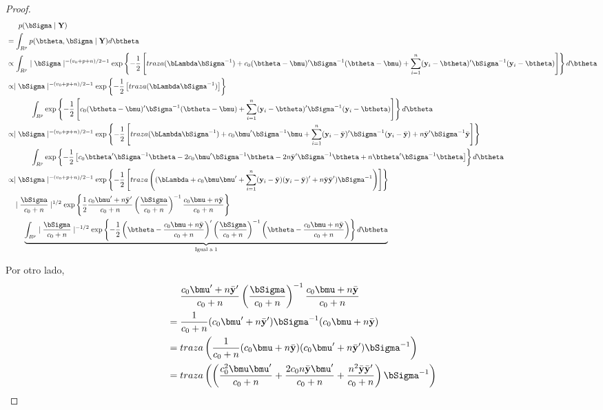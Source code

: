\documentclass[10pt,openright]{book}\usepackage[]{graphicx}\usepackage[]{color}
\begin{document}
\begin{proof}
\begin{align*}
&\ \ \ \ \ p(\bSigma\mid\mathbf{Y})\\
&=\int_{R^p} p(\btheta,\bSigma\mid\mathbf{Y})d\btheta\\
&\propto \int_{R^p}\mid\bSigma\mid^{-(v_0+p+n)/2-1}\exp\left\{-\frac{1}{2}\left[traza(\bLambda\bSigma^{-1})+c_0(\btheta-\bmu)'\bSigma^{-1}(\btheta-\bmu)+\sum_{i=1}^n(\mathbf{y}_i-\btheta)'\bSigma^{-1}(\mathbf{y}_i-\btheta)\right]\right\}d\btheta\\
&\propto \mid\bSigma\mid^{-(v_0+p+n)/2-1} \exp\left\{-\frac{1}{2}\left[traza(\bLambda\bSigma^{-1})\right]\right\}\\
&\ \ \ \ \ \ \ \ \ \ \int_{R^p}\exp\left\{-\frac{1}{2}\left[c_0(\btheta-\bmu)'\bSigma^{-1}(\btheta-\bmu)+\sum_{i=1}^n(\mathbf{y}_i-\btheta)'\bSigma^{-1}(\mathbf{y}_i-\btheta)\right]\right\}d\btheta\\
&\propto \mid\bSigma\mid^{-(v_0+p+n)/2-1} \exp\left\{-\frac{1}{2}\left[traza(\bLambda\bSigma^{-1})+c_0\bmu'\bSigma^{-1}\bmu+\sum_{i=1}^n(\mathbf{y}_i-\bar{\mathbf{y}})'\bSigma^{-1}(\mathbf{y}_i-\bar{\mathbf{y}})+n\bar{\mathbf{y}}'\bSigma^{-1}\bar{\mathbf{y}}\right]\right\}\\
&\ \ \ \ \ \ \ \ \ \ \int_{R^p}\exp\left\{-\frac{1}{2}\left[c_0\btheta'\bSigma^{-1}\btheta-2c_0\bmu'\bSigma^{-1}\btheta-2n\bar{\mathbf{y}}'\bSigma^{-1}\btheta+n\btheta'\bSigma^{-1}\btheta\right]\right\}d\btheta\\
&\propto \mid\bSigma\mid^{-(v_0+p+n)/2-1} \exp\left\{-\frac{1}{2}\left[traza\left((\bLambda+c_0\bmu\bmu'+\sum_{i=1}^n(\mathbf{y}_i-\bar{\mathbf{y}})(\mathbf{y}_i-\bar{\mathbf{y}})'+n\bar{\mathbf{y}}\bar{\mathbf{y}}')\bSigma^{-1}\right)\right]\right\}\\
&\ \ \ \mid\frac{\bSigma}{c_0+n}\mid^{1/2}\exp\left\{\frac{1}{2}\frac{c_0\bmu'+n\bar{\mathbf{y}}'}{c_0+n}\left(\frac{\bSigma}{c_0+n}\right)^{-1}\frac{c_0\bmu+n\bar{\mathbf{y}}}{c_0+n}\right\}\\
&\ \ \ \ \ \ \ \underbrace{\int_{R^p}\mid\frac{\bSigma}{c_0+n}\mid^{-1/2}\exp\left\{-\frac{1}{2}\left(\btheta-\frac{c_0\bmu+n\bar{\mathbf{y}}}{c_0+n}\right)'\left(\frac{\bSigma}{c_0+n}\right)^{-1}\left(\btheta-\frac{c_0\bmu+n\bar{\mathbf{y}}}{c_0+n}\right)\right\}d\btheta}_{\text{Igual a 1}}
\end{align*}

Por otro lado, 
\begin{align*}
&\ \ \ \ \frac{c_0\bmu'+n\bar{\mathbf{y}}'}{c_0+n}\left(\frac{\bSigma}{c_0+n}\right)^{-1}\frac{c_0\bmu+n\bar{\mathbf{y}}}{c_0+n}\\
&=\frac{1}{c_0+n}(c_0\bmu'+n\bar{\mathbf{y}}')\bSigma^{-1}(c_0\bmu+n\bar{\mathbf{y}})\\
&=traza\left(\frac{1}{c_0+n}(c_0\bmu+n\bar{\mathbf{y}})(c_0\bmu'+n\bar{\mathbf{y}}')\bSigma^{-1}\right)\\
&=traza\left(\left(\frac{c_0^2\bmu\bmu'}{c_0+n}+\frac{2c_0n\bar{\mathbf{y}}\bmu'}{c_0+n}+\frac{n^2\bar{\mathbf{y}}\bar{\mathbf{y}}'}{c_0+n}\right)\bSigma^{-1}\right)
\end{align*}


\end{proof}
\end{document}
